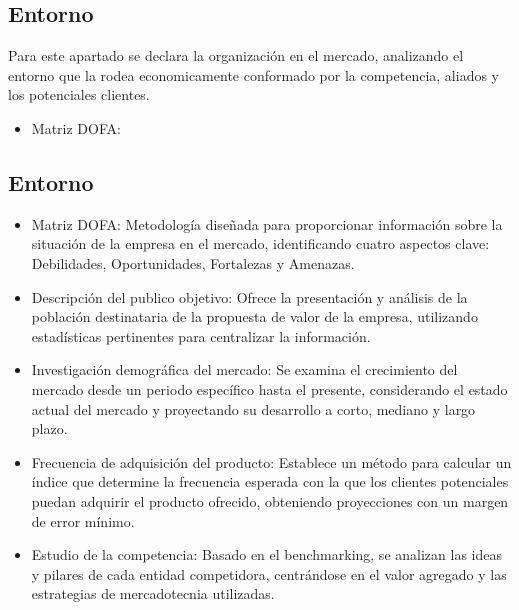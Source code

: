 
{
    \color{orange}   \subsection{Entorno}
    Para este apartado se declara la organización en el mercado, analizando el entorno que la rodea economicamente conformado por la competencia, aliados y los potenciales clientes.
    \begin{itemize}
        \item Matriz DOFA: 
    \end{itemize}
}
{\color{blue}\subsection{Entorno}

\begin{itemize}
    \item Matriz DOFA: Metodología diseñada para proporcionar información sobre la situación de la empresa en el mercado, identificando cuatro aspectos clave: Debilidades, Oportunidades, Fortalezas y Amenazas.
    \item Descripción del publico objetivo: Ofrece la presentación y análisis de la población destinataria de la propuesta de valor de la empresa, utilizando estadísticas pertinentes para centralizar la información.
    \item Investigación demográfica del mercado: Se examina el crecimiento del mercado desde un periodo específico hasta el presente, considerando el estado actual del mercado y proyectando su desarrollo a corto, mediano y largo plazo.
    \item Frecuencia de adquisición del producto: Establece un método para calcular un índice que determine la frecuencia esperada con la que los clientes potenciales puedan adquirir el producto ofrecido, obteniendo proyecciones con un margen de error mínimo.
    \item Estudio de la competencia: Basado en el benchmarking, se analizan las ideas y pilares de cada entidad competidora, centrándose en el valor agregado y las estrategias de mercadotecnia utilizadas.
\end{itemize}
}